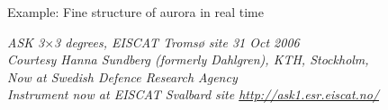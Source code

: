 \begin{frame}[fragile,t]
\frametitle{\hfill}
\vspace{\mytopbit}
{Example: Fine structure of aurora in real time}

\begin{center}
\end{center}

{\colblack \scriptsize \it ASK 3$\times$3 degrees, EISCAT Troms{\o} site 31 Oct 2006\\
Courtesy Hanna Sundberg (formerly Dahlgren), KTH, Stockholm,\\Now at Swedish Defence Research Agency\\
Instrument now at EISCAT Svalbard site \url{http://ask1.esr.eiscat.no/}
}


\end{frame}
